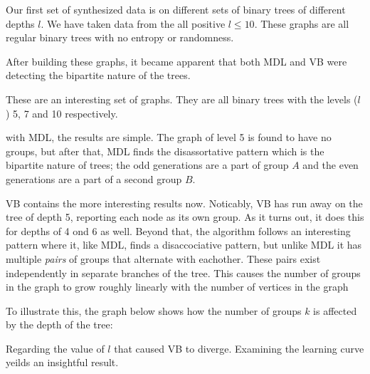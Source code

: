Our first set of synthesized data is on different sets of
binary trees of different depths $l$. We have taken data from
the all positive $l \le 10$. These graphs are all regular binary
trees with no entropy or randomness.

After building these graphs, it became apparent that both MDL and
VB were detecting the bipartite nature of the trees.




These are an interesting set of graphs. They are all binary trees with
the levels ($l$) 5, 7 and 10 respectively.

with MDL, the results are simple. The graph of level 5 is found to have
no groups, but after that, MDL finds the disassortative pattern which
is the bipartite nature of trees; the odd generations are a part of
group $A$ and the even generations are a part of a second group $B$.

VB contains the more interesting results now. Noticably, VB has run away
on the tree of depth 5, reporting each node as its own group.  As it
turns out, it does this for depths of 4 ond 6 as well. Beyond that, the
algorithm follows an interesting pattern where it, like MDL, finds a
disaccociative pattern, but unlike MDL it has multiple \emph{pairs} of
groups that alternate with eachother. These pairs exist independently in
separate branches of the tree. This causes the number of groups in the
graph to grow roughly linearly with the number of vertices in the graph

To illustrate this, the graph below shows how the number of groups $k$ is
affected by the depth of the tree:



Regarding the value of $l$ that caused VB to diverge. Examining the
learning curve yeilds an insightful result.

